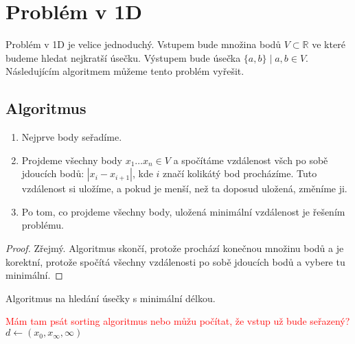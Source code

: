 \chapter{Problém v 1D}
\label{chap:problem_1D}
Problém v 1D je velice jednoduchý. Vstupem bude množina bodů $V \subset \mathbb{R}$ ve které budeme hledat nejkratší úsečku. Výstupem bude úsečka $\{a, b\} \mid a, b \in V$. Následujícím algoritmem můžeme tento problém vyřešit.

\section{Algoritmus}
\label{sec:algoritmus_1D}
\begin{enumerate}
    \item Nejprve body seřadíme.
    \item Projdeme všechny body $x_1\ldots x_n \in V$ a spočítáme vzdálenost všch po sobě jdoucích bodů: $|x_i-x_{i+1}|$, kde $i$ značí kolikátý bod procházíme. Tuto vzdálenost si uložíme, a pokud je menší, než ta doposud uložená, změníme ji. 
    \item Po tom, co projdeme všechny body, uložená minimální vzdálenost je řešením problému. 
\end{enumerate}
\begin{proof}
    Zřejmý. Algoritmus skončí, protože prochází konečnou množinu bodů a je korektní, protože spočítá všechny vzdálenosti po sobě jdoucích bodů a vybere tu minimální. 
\end{proof}
\begin{algorithm}
    \caption{Algoritmus na hledání úsečky s minimální délkou.}
    \label{alg:algoritmus_1D}

   
    \BlankLine
    \textcolor{red}{Mám tam psát sorting algoritmus nebo můžu počítat, že vstup už bude seřazený?} \;
    $d \leftarrow (x_0, x_\infty, \infty)$ \;
\end{algorithm}